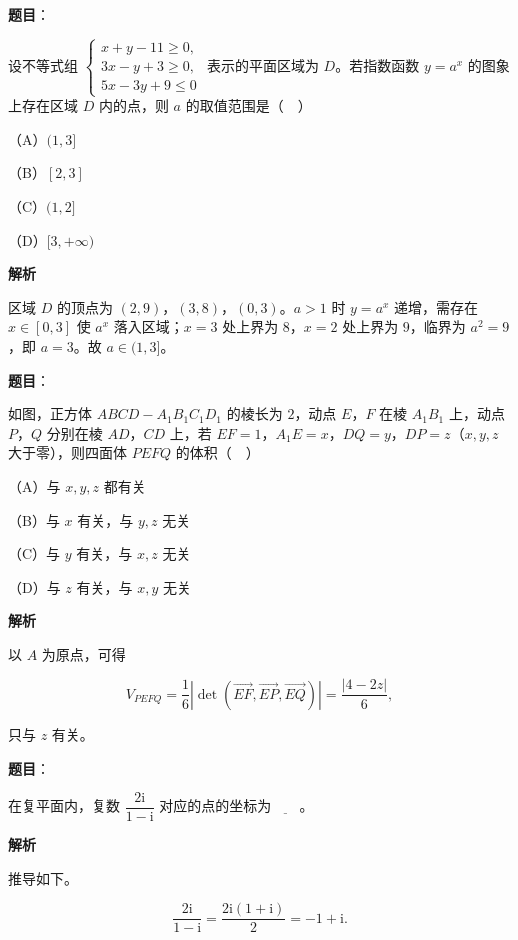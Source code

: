 \begin{answer}

\textbf{题目}：

设不等式组 $\begin{cases}x+y-11\geqslant0,\\ 3x-y+3\geqslant0,\\ 5x-3y+9\leqslant0\end{cases}$ 表示的平面区域为 $D$。若指数函数 $y=a^x$ 的图象上存在区域 $D$ 内的点，则 $a$ 的取值范围是（　）

（A）$(1,3]$

（B）$[2,3]$

（C）$(1,2]$

（D）$[3,+\infty)$

\textbf{解析}

区域 $D$ 的顶点为 $(2,9)$，$(3,8)$，$(0,3)$。$a>1$ 时 $y=a^x$ 递增，需存在 $x\in[0,3]$ 使 $a^x$ 落入区域；$x=3$ 处上界为 $8$，$x=2$ 处上界为 $9$，临界为 $a^2=9$，即 $a=3$。故 $a\in(1,3]$。


\end{answer}
\begin{answer}

\textbf{题目}：

如图，正方体 $ABCD-A_1B_1C_1D_1$ 的棱长为 $2$，动点 $E$，$F$ 在棱 $A_1B_1$ 上，动点 $P$，$Q$ 分别在棱 $AD$，$CD$ 上，若 $EF=1$，$A_1E=x$，$DQ=y$，$DP=z$（$x,y,z$ 大于零），则四面体 $PEFQ$ 的体积（　）

（A）与 $x,y,z$ 都有关

（B）与 $x$ 有关，与 $y,z$ 无关

（C）与 $y$ 有关，与 $x,z$ 无关

（D）与 $z$ 有关，与 $x,y$ 无关
\nopagebreak[4]
\begin{center}\end{center}
\nopagebreak[4]
\textbf{解析}

以 $A$ 为原点，可得

\nopagebreak[4]
\[V_{PEFQ}=\frac16\left|\det(\overrightarrow{EF},\overrightarrow{EP},\overrightarrow{EQ})\right|
=\frac{|4-2z|}6,\]

只与 $z$ 有关。


\end{answer}
\begin{answer}

\textbf{题目}：

在复平面内，复数 $\dfrac{2\mathrm i}{1-\mathrm i}$ 对应的点的坐标为$\underline{\qquad}$。

\textbf{解析}

推导如下。

\nopagebreak[4]
\[\frac{2\mathrm i}{1-\mathrm i}=\frac{2\mathrm i(1+\mathrm i)}2=-1+\mathrm i.\]


\end{answer}
